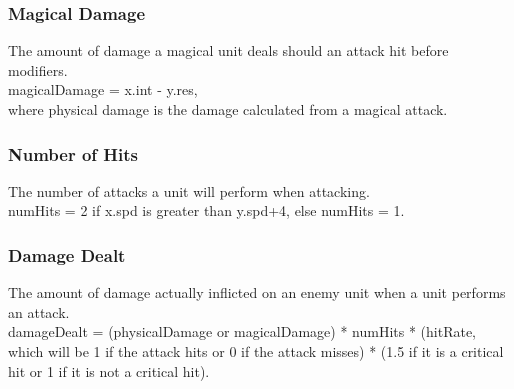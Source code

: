\documentclass{article}
\begin{document}
\subsubsection{Magical Damage}
The amount of damage a magical unit deals should an attack hit before modifiers. \\
magicalDamage = x.int - y.res, \\
where physical damage is the damage calculated from a magical attack.

\subsubsection{Number of Hits}
The number of attacks a unit will perform when attacking. \\
numHits = 2 if x.spd is greater than y.spd+4, else numHits = 1.

\subsubsection{Damage Dealt}
The amount of damage actually inflicted on an enemy unit when a unit performs an attack. \\
damageDealt = (physicalDamage or magicalDamage) * numHits * (hitRate, which will be 1 if the attack hits or 0 if the attack misses) * (1.5 if it is a critical hit or 1 if it is not a critical hit).
\end{document}

